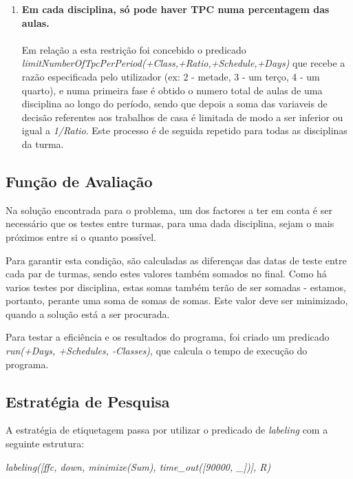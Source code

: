 \documentclass{llncs}
\begin{document}
\begin{enumerate}
	\item \textbf{Em cada disciplina, só pode haver TPC numa percentagem das aulas.} \\\\
		Em relação a esta restrição foi concebido o predicado  \textit{limitNumberOfTpcPerPeriod(+Class,+Ratio,+Schedule,+Days)} que recebe a razão especificada pelo utilizador (ex: 2 - metade, 3 - um terço, 4 - um 
		quarto), e numa primeira fase é obtido o numero total de aulas de uma disciplina ao longo do período, sendo que depois a soma das variaveis de decisão referentes aos trabalhos de casa é limitada de modo a ser 
		inferior ou igual a  \textit{1/Ratio}. Este processo é de seguida repetido para todas as disciplinas da turma.
	 	\\

	\end{enumerate}
		
	
	
 
 

\subsection{Função de Avaliação}
Na solução encontrada para o problema, um dos factores a ter em conta é ser necessário que os testes entre turmas, para uma dada disciplina, sejam o mais próximos entre si o quanto possível. \par
Para garantir esta condição, são calculadas as diferenças das datas de teste entre cada par de turmas, sendo estes valores também somados no final. Como há varios testes por disciplina, estas somas também terão de ser somadas - estamos, portanto, perante uma soma de somas de somas. Este valor deve ser minimizado, quando a solução está a ser procurada.\par
Para testar a eficiência e os resultados do programa, foi criado um predicado \textit{run(+Days, +Schedules, -Classes)}, que calcula o tempo de execução do programa.

\subsection{Estratégia de Pesquisa}
A estratégia de etiquetagem passa por utilizar o predicado de \textit{labeling} com a seguinte estrutura:\newline\newline
\centerline{\textit{labeling([ffc, down, minimize(Sum), time\_out([90000, \_])], R)}}\newline
 
\end{document}
